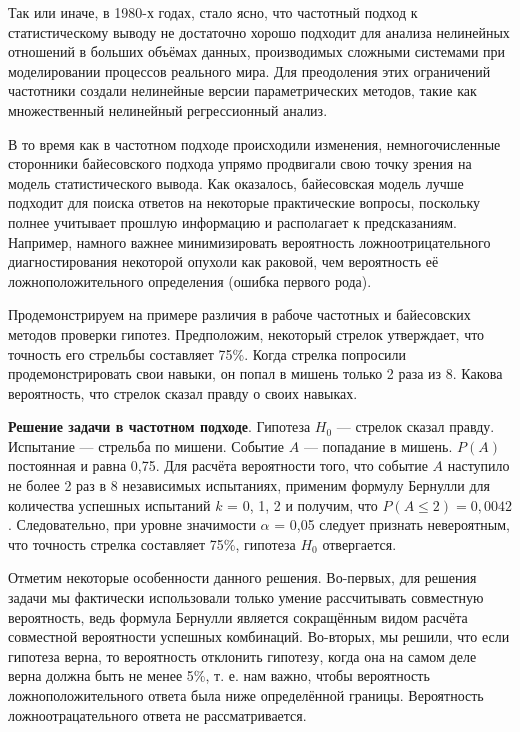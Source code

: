 Так или иначе, в 1980-х годах, стало ясно, что частотный подход к статистическому выводу не достаточно хорошо подходит для анализа нелинейных отношений в больших объёмах данных, производимых сложными системами при моделировании процессов реального мира\cite[стр. 10]{handbook_stat_dm}. Для преодоления этих ограничений частотники создали нелинейные версии параметрических методов, такие как множественный нелинейный регрессионный анализ.

В то время как в частотном подходе происходили изменения, немногочисленные сторонники байесовского подхода упрямо продвигали свою точку зрения на модель статистического вывода. Как оказалось, байесовская модель лучше подходит для поиска ответов на некоторые практические вопросы, поскольку полнее учитывает прошлую информацию и располагает к предсказаниям. Например, намного важнее минимизировать вероятность ложноотрицательного диагностирования некоторой опухоли как раковой, чем вероятность её ложноположительного определения (ошибка первого рода). 

Продемонстрируем на примере различия в рабоче частотных и байесовских методов проверки гипотез. Предположим, некоторый стрелок утверждает, что точность его стрельбы составляет 75\%. Когда стрелка попросили продемонстрировать свои навыки, он попал в мишень только 2 раза из 8. Какова вероятность, что стрелок сказал правду о своих навыках.

\textbf{Решение задачи в частотном подходе}. Гипотеза $H_{0}$ --- стрелок сказал правду. Испытание --- стрельба по мишени. Событие $A$ --- попадание в мишень. $P(A)$ постоянная и равна 0,75. Для расчёта вероятности того, что событие $A$ наступило не более 2 раз в 8 независимых испытаниях, применим формулу Бернулли для количества успешных испытаний $k$ = 0, 1, 2 и получим, что $P(A\leq 2)=0,0042$. Следовательно, при уровне значимости $\alpha$ = 0,05 следует признать невероятным, что точность стрелка составляет 75\%, гипотеза $H_{0}$ отвергается. 

Отметим некоторые особенности данного решения. Во-первых, для решения задачи мы фактически использовали только умение рассчитывать совместную вероятность, ведь формула Бернулли является сокращённым видом расчёта совместной вероятности успешных комбинаций. Во-вторых, мы решили, что если гипотеза верна, то  вероятность отклонить гипотезу, когда она на самом деле верна должна быть не менее 5\%, т. е. нам важно, чтобы вероятность ложноположительного ответа была ниже определённой границы. Вероятность ложноотрацательного ответа не рассматривается.

